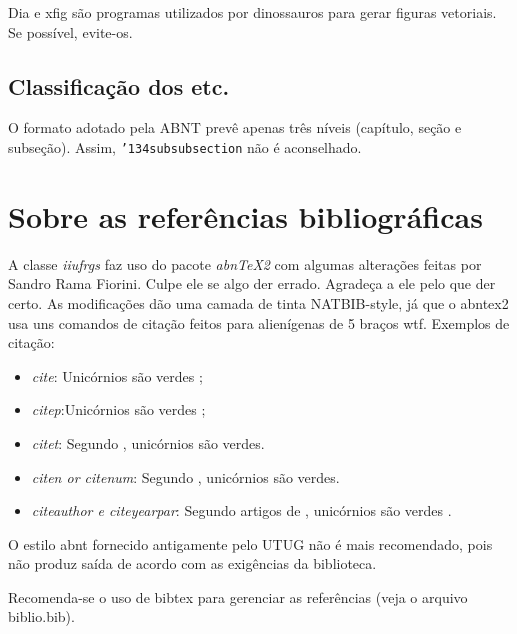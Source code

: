 \documentclass[../ppgc-tese.tex]{subfiles}
\begin{document}
Dia e xfig são programas utilizados por dinossauros para gerar figuras vetoriais. Se possível, evite-os.

\subsection{Classificação dos etc.}

O formato adotado pela ABNT prevê apenas três níveis (capítulo, seção e subseção). Assim, \texttt{\char'134subsubsection} não é aconselhado.

\section{Sobre as referências bibliográficas}

A classe \emph{iiufrgs} faz uso do pacote \emph{abnTeX2} com algumas alterações
feitas por Sandro Rama Fiorini. Culpe ele se algo der errado. Agradeça a ele
pelo que der certo. As modificações dão uma camada de tinta NATBIB-style,
já que o abntex2 usa uns comandos de citação feitos para alienígenas de 5 braços
wtf. Exemplos de citação:

\begin{itemize}
    \item \emph{cite}: Unicórnios são verdes \cite{Adams2009Conceptual};
    \item \emph{citep}:Unicórnios são verdes \citep{Adams2009Conceptual};
    \item \emph{citet}: Segundo \citet{Adams2009Conceptual}, unicórnios são
                        verdes.
    \item \emph{citen or citenum}: Segundo ,
        unicórnios são verdes.
    \item \emph{citeauthor e citeyearpar}: Segundo artigos de
        \citeauthor{Adams2009Conceptual} , unicórnios são verdes
        \citeyearpar{Adams2009Conceptual}.

\end{itemize}

O estilo abnt fornecido antigamente pelo UTUG não é mais recomendado, pois não
produz saída de acordo com as exigências da biblioteca.

Recomenda-se o uso de bibtex para gerenciar as referências (veja o arquivo
biblio.bib).
\end{document}
